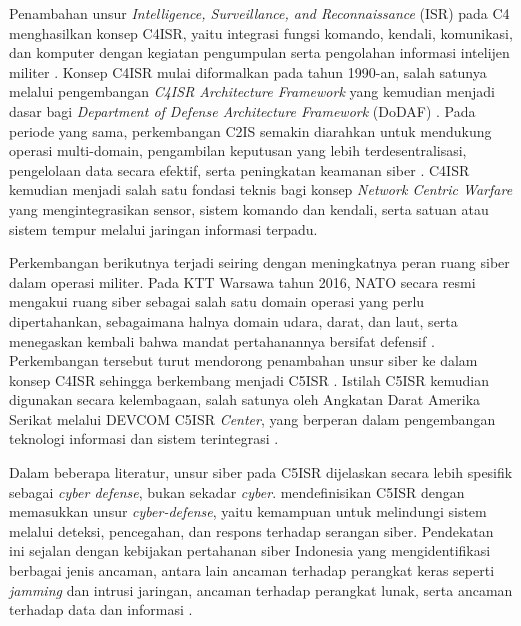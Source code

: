 Penambahan unsur \textit{Intelligence, Surveillance, and Reconnaissance} (ISR) pada C4 menghasilkan konsep C4ISR, yaitu integrasi fungsi komando, kendali, komunikasi, dan komputer dengan kegiatan pengumpulan serta pengolahan informasi intelijen militer \parencite{Petrovski2023}.
Konsep C4ISR mulai diformalkan pada tahun 1990-an, salah satunya melalui pengembangan \textit{C4ISR Architecture Framework} yang kemudian menjadi dasar bagi \textit{Department of Defense Architecture Framework} (DoDAF) \parencite{C4ISRAWG1998}.
Pada periode yang sama, perkembangan C2IS semakin diarahkan untuk mendukung operasi multi-domain, pengambilan keputusan yang lebih terdesentralisasi, pengelolaan data secara efektif, serta peningkatan keamanan siber \parencite{Todorovic2025}.
C4ISR kemudian menjadi salah satu fondasi teknis bagi konsep \textit{Network Centric Warfare} yang mengintegrasikan sensor, sistem komando dan kendali, serta satuan atau sistem tempur melalui jaringan informasi terpadu.

Perkembangan berikutnya terjadi seiring dengan meningkatnya peran ruang siber dalam operasi militer.
Pada KTT Warsawa tahun 2016, NATO secara resmi mengakui ruang siber sebagai salah satu domain operasi yang perlu dipertahankan, sebagaimana halnya domain udara, darat, dan laut, serta menegaskan kembali bahwa mandat pertahanannya bersifat defensif \parencite[para.~70]{NATO2016Warsaw}.
Perkembangan tersebut turut mendorong penambahan unsur siber ke dalam konsep C4ISR sehingga berkembang menjadi C5ISR \parencite{Todorovic2025}.
Istilah C5ISR kemudian digunakan secara kelembagaan, salah satunya oleh Angkatan Darat Amerika Serikat melalui DEVCOM C5ISR \textit{Center}, yang berperan dalam pengembangan teknologi informasi dan sistem terintegrasi \parencite{DEVCOMC5ISR2019}.

Dalam beberapa literatur, unsur siber pada C5ISR dijelaskan secara lebih spesifik sebagai \textit{cyber defense}, bukan sekadar \textit{cyber}.
\textcite{Petrovski2023} mendefinisikan C5ISR dengan memasukkan unsur \textit{cyber-defense}, yaitu kemampuan untuk melindungi sistem melalui deteksi, pencegahan, dan respons terhadap serangan siber.
Pendekatan ini sejalan dengan kebijakan pertahanan siber Indonesia yang mengidentifikasi berbagai jenis ancaman, antara lain ancaman terhadap perangkat keras seperti \textit{jamming} dan intrusi jaringan, ancaman terhadap perangkat lunak, serta ancaman terhadap data dan informasi \parencite{KemhanRI2014}.

